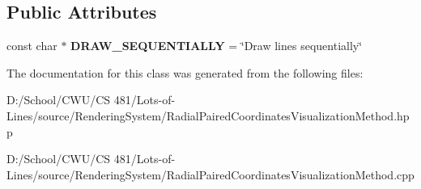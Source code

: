 \subsection*{Public Attributes}
\begin{DoxyCompactItemize}
\item 
const char $\ast$ {\bfseries D\+R\+A\+W\+\_\+\+S\+E\+Q\+U\+E\+N\+T\+I\+A\+L\+LY} = \char`\"{}Draw lines sequentially\char`\"{}\hypertarget{class_lots_of_lines_1_1_radial_paired_coordinates_visualization_method_ae6cf42075bf3f7afc03e20046c270fac}{}\label{class_lots_of_lines_1_1_radial_paired_coordinates_visualization_method_ae6cf42075bf3f7afc03e20046c270fac}

\end{DoxyCompactItemize}


The documentation for this class was generated from the following files\+:\begin{DoxyCompactItemize}
\item 
D\+:/\+School/\+C\+W\+U/\+C\+S 481/\+Lots-\/of-\/\+Lines/source/\+Rendering\+System/Radial\+Paired\+Coordinates\+Visualization\+Method.\+hpp\item 
D\+:/\+School/\+C\+W\+U/\+C\+S 481/\+Lots-\/of-\/\+Lines/source/\+Rendering\+System/Radial\+Paired\+Coordinates\+Visualization\+Method.\+cpp\end{DoxyCompactItemize}
